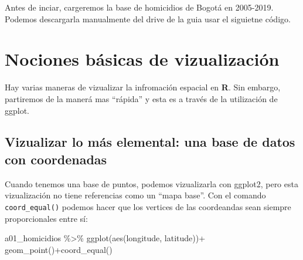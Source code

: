\documentclass[
]{book}
\newenvironment{Shaded}{\begin{snugshade}}{\end{snugshade}}
\newcommand{\AttributeTok}[1]{\textcolor[rgb]{0.77,0.63,0.00}{#1}}
\newcommand{\CommentTok}[1]{\textcolor[rgb]{0.56,0.35,0.01}{\textit{#1}}}
\newcommand{\FunctionTok}[1]{\textcolor[rgb]{0.00,0.00,0.00}{#1}}
\newcommand{\NormalTok}[1]{#1}
\newcommand{\OtherTok}[1]{\textcolor[rgb]{0.56,0.35,0.01}{#1}}
\newcommand{\SpecialCharTok}[1]{\textcolor[rgb]{0.00,0.00,0.00}{#1}}
\newcommand{\StringTok}[1]{\textcolor[rgb]{0.31,0.60,0.02}{#1}}
\begin{document}
Antes de inciar, cargeremos la base de homicidios de Bogotá en 2005-2019. Podemos descargarla manualmente del drive de la guia usar el siguietne código.

\begin{Shaded}
\end{Shaded}

\hypertarget{nociones-buxe1sicas-de-vizualizaciuxf3n}{%
\chapter{Nociones básicas de vizualización}\label{nociones-buxe1sicas-de-vizualizaciuxf3n}}

Hay varias maneras de vizualizar la infromación espacial en \textbf{R}. Sin embargo, partiremos de la manerá mas ``rápida'' y esta es a través de la utilización de ggplot.

\hypertarget{vizualizar-lo-muxe1s-elemental-una-base-de-datos-con-coordenadas}{%
\section{Vizualizar lo más elemental: una base de datos con coordenadas}\label{vizualizar-lo-muxe1s-elemental-una-base-de-datos-con-coordenadas}}

Cuando tenemos una base de puntos, podemos vizualizarla con ggplot2, pero esta vizualización no tiene referencias como un ``mapa base''. Con el comando \texttt{coord\_equal()} podemos hacer que los vertices de las coordeandas sean siempre proporcionales entre sí:

\begin{Shaded}
\begin{Highlighting}[]
\NormalTok{a01\_homicidios }\SpecialCharTok{\%\textgreater{}\%} \FunctionTok{ggplot}\NormalTok{(}\FunctionTok{aes}\NormalTok{(longitude, latitude))}\SpecialCharTok{+}
    \FunctionTok{geom\_point}\NormalTok{()}\SpecialCharTok{+}\FunctionTok{coord\_equal}\NormalTok{()}
\end{Highlighting}
\end{Shaded}
\end{document}
